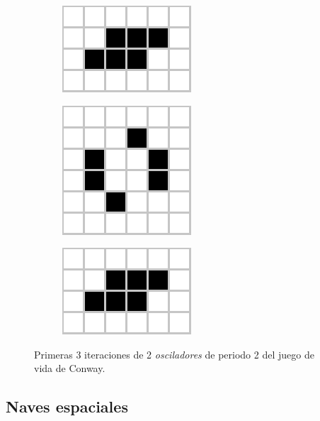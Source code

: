 \documentclass[../proyecto.tex]{memoir}
\begin{document}
\begin{figure}[H]
\begin{subfigure}[b]{0.3\linewidth}
        \includegraphics[height=0.35\linewidth]{./images/toad1.png}
        \caption{}
        \label{fig:toad1}
    \end{subfigure}
	\begin{subfigure}[b]{0.3\linewidth} 
        \centering
        \includegraphics[height=0.45\linewidth]{./images/toad2.png}
        \caption{}
        \label{fig:toad2}
    \end{subfigure}
	\begin{subfigure}[b]{0.3\linewidth} 
        \centering
        \includegraphics[height=0.35\linewidth]{./images/toad3.png}
        \caption{}
        \label{fig:toad3}
    \end{subfigure}
	\caption{Primeras 3 iteraciones de 2 \textit{osciladores} de periodo 2 del juego de vida de Conway.}
	\label{fig:congIniciales3}
\end{figure} 

\subsection{Naves espaciales} \label{spaceships}
\end{document}

